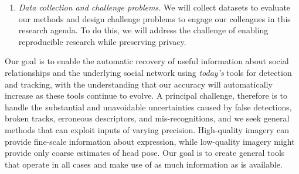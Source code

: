 \begin{enumerate}
\vspace{-0.1in}\item \emph{Data collection and challenge problems.} We will collect datasets to evaluate our methods and design challenge problems to engage our colleagues in this research agenda. To do this, we will address the challenge of enabling reproducible research while preserving privacy.

\end{enumerate}




Our goal is to enable the automatic recovery of useful information about social relationships and the underlying social network using \emph{today's} tools for detection and tracking, with the understanding that our accuracy will automatically increase as these tools continue to evolve. A principal challenge, therefore is to handle the substantial and unavoidable uncertainties caused by false detections, broken tracks, erroneous descriptors, and mis-recognitions, and we seek general methods that can exploit inputs of varying precision. High-quality imagery can provide fine-scale information about expression, while low-quality imagery might provide only coarse estimates of head pose. Our goal is to create general tools that operate in all cases and make use of as much information as is available.


